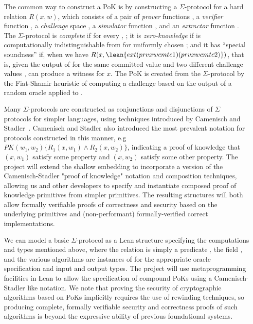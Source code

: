 The common way to construct a PoK is by constructing a $\Sigma$-protocol for a hard relation $R(x,w)$, which consists of a pair of {\em prover} functions , a {\em verifier} function , a {\em challenge} space , a {\em simulator} function , and an {\em extractor} function .
The $\Sigma$-protocol is {\em complete} if for every , ;
it is {\em zero-knowledge} if  is computationally indistinguishable from  for uniformly chosen ;
and it has ``special soundness'' if, when  we have $R(x,\lean{ext (prv x w cmt c1) (prv x w cmt c2)})$, that is, given the output of  for the same committed value  and two different challenge values ,  can produce a witness for $x$.
The PoK is created from the $\Sigma$-protocol by the Fiat-Shamir heuristic of computing a challenge based on the output of a random oracle applied to .

Many $\Sigma$-protocols are constructed as conjunctions and disjunctions of $\Sigma$ protocols for simpler languages, using techniques introduced by Camenisch and Stadler~\cite{camenisch1997proof}.
Camenisch and Stadler also introduced the most prevalent notation for protocols constructed in this manner, e.g $PK(w_1,w_2)\{ R_1(x,w_1) \land R_2(x,w_2)\}$, indicating a proof of knowledge that $(x,w_1)$ satisfy some property and $(x,w_2)$ satisfy some other property.
The project will extend the \vcvio shallow embedding to incorporate a version of the Camenisch-Stadler "proof of knowledge" notation and composition techniques, allowing us and other developers to specify and instantiate composed proof of knowledge primitives from simpler primitives.
The resulting structures will both allow formally verifiable proofs of correctness and security based on the underlying primitives and (non-performant) formally-verified correct implementations.

We can model a basic $\Sigma$-protocol as a Lean structure specifying the computations and types mentioned above, where the relation  is simply a predicate , the field , and the various algorithms are instances of  for the appropriate oracle specification and input and output types.
The project will use metaprogramming facilities in Lean to allow the specification of compound PoKs using a Camenisch-Stadler like notation.
We note that proving the security of cryptographic algorithms based on PoKs implicitly requires the use of rewinding techniques, so producing complete, formally verifiable security and correctness proofs of such algorithms is beyond the expressive ability of previous foundational systems.

